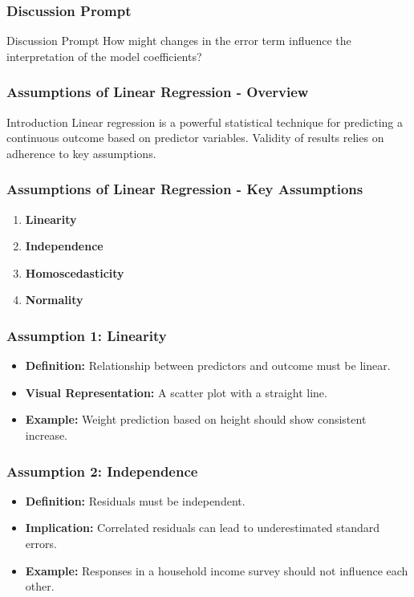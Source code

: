 \documentclass[aspectratio=169]{beamer}
\begin{document}
\begin{frame}[fragile]
    \frametitle{Discussion Prompt}
    \begin{block}{Discussion Prompt}
        How might changes in the error term influence the interpretation of the model coefficients?
    \end{block}
\end{frame}

\begin{frame}[fragile]
    \frametitle{Assumptions of Linear Regression - Overview}
    \begin{block}{Introduction}
        Linear regression is a powerful statistical technique for predicting a continuous outcome based on predictor variables. Validity of results relies on adherence to key assumptions.
    \end{block}
\end{frame}

\begin{frame}[fragile]
    \frametitle{Assumptions of Linear Regression - Key Assumptions}
    \begin{enumerate}
        \item \textbf{Linearity}
        \item \textbf{Independence}
        \item \textbf{Homoscedasticity}
        \item \textbf{Normality}
    \end{enumerate}
\end{frame}

\begin{frame}[fragile]
    \frametitle{Assumption 1: Linearity}
    \begin{itemize}
        \item \textbf{Definition:} Relationship between predictors and outcome must be linear.
        \item \textbf{Visual Representation:} A scatter plot with a straight line.
        \item \textbf{Example:} Weight prediction based on height should show consistent increase.
    \end{itemize}
\end{frame}

\begin{frame}[fragile]
    \frametitle{Assumption 2: Independence}
    \begin{itemize}
        \item \textbf{Definition:} Residuals must be independent.
        \item \textbf{Implication:} Correlated residuals can lead to underestimated standard errors.
        \item \textbf{Example:} Responses in a household income survey should not influence each other.
    \end{itemize}
\end{frame}
\end{document}
